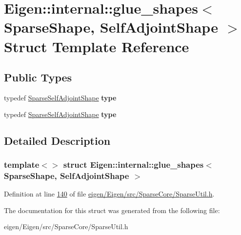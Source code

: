 \hypertarget{struct_eigen_1_1internal_1_1glue__shapes_3_01_sparse_shape_00_01_self_adjoint_shape_01_4}{}\section{Eigen\+:\+:internal\+:\+:glue\+\_\+shapes$<$ Sparse\+Shape, Self\+Adjoint\+Shape $>$ Struct Template Reference}
\label{struct_eigen_1_1internal_1_1glue__shapes_3_01_sparse_shape_00_01_self_adjoint_shape_01_4}
\subsection*{Public Types}
\begin{DoxyCompactItemize}
\item 
\mbox{\label{struct_eigen_1_1internal_1_1glue__shapes_3_01_sparse_shape_00_01_self_adjoint_shape_01_4_a70896a5002f3928206d3bba0511372b1}} 
typedef \hyperlink{struct_eigen_1_1internal_1_1_sparse_self_adjoint_shape}{Sparse\+Self\+Adjoint\+Shape} {\bfseries type}
\item 
\mbox{\label{struct_eigen_1_1internal_1_1glue__shapes_3_01_sparse_shape_00_01_self_adjoint_shape_01_4_a70896a5002f3928206d3bba0511372b1}} 
typedef \hyperlink{struct_eigen_1_1internal_1_1_sparse_self_adjoint_shape}{Sparse\+Self\+Adjoint\+Shape} {\bfseries type}
\end{DoxyCompactItemize}


\subsection{Detailed Description}
\subsubsection*{template$<$$>$\newline
struct Eigen\+::internal\+::glue\+\_\+shapes$<$ Sparse\+Shape, Self\+Adjoint\+Shape $>$}



Definition at line \hyperlink{eigen_2_eigen_2src_2_sparse_core_2_sparse_util_8h_source_l00140}{140} of file \hyperlink{eigen_2_eigen_2src_2_sparse_core_2_sparse_util_8h_source}{eigen/\+Eigen/src/\+Sparse\+Core/\+Sparse\+Util.\+h}.



The documentation for this struct was generated from the following file\+:\begin{DoxyCompactItemize}
\item 
eigen/\+Eigen/src/\+Sparse\+Core/\+Sparse\+Util.\+h\end{DoxyCompactItemize}
